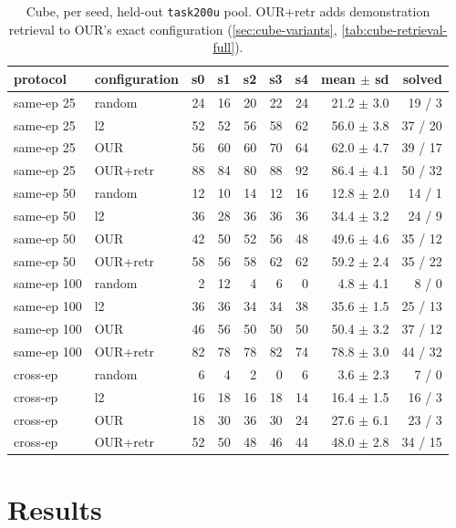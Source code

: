 \documentclass[11pt]{article}
\begin{document}
\begin{table}[H]
\centering\small
\caption{Cube, per seed, held-out \texttt{task200u} pool. OUR+retr adds demonstration
retrieval to OUR's exact configuration (\cref{sec:cube-variants}, \cref{tab:cube-retrieval-full}).}
\begin{tabular}{llrrrrrrr}
\toprule
protocol & configuration & s0 & s1 & s2 & s3 & s4 & mean $\pm$ sd & solved \\
\midrule
same-ep 25 & random & 24 & 16 & 20 & 22 & 24 & 21.2 $\pm$ 3.0 & 19 / 3 \\
same-ep 25 & l2 & 52 & 52 & 56 & 58 & 62 & 56.0 $\pm$ 3.8 & 37 / 20 \\
same-ep 25 & OUR & 56 & 60 & 60 & 70 & 64 & 62.0 $\pm$ 4.7 & 39 / 17 \\
same-ep 25 & OUR+retr & 88 & 84 & 80 & 88 & 92 & 86.4 $\pm$ 4.1 & 50 / 32 \\
\midrule
same-ep 50 & random & 12 & 10 & 14 & 12 & 16 & 12.8 $\pm$ 2.0 & 14 / 1 \\
same-ep 50 & l2 & 36 & 28 & 36 & 36 & 36 & 34.4 $\pm$ 3.2 & 24 / 9 \\
same-ep 50 & OUR & 42 & 50 & 52 & 56 & 48 & 49.6 $\pm$ 4.6 & 35 / 12 \\
same-ep 50 & OUR+retr & 58 & 56 & 58 & 62 & 62 & 59.2 $\pm$ 2.4 & 35 / 22 \\
\midrule
same-ep 100 & random & 2 & 12 & 4 & 6 & 0 & 4.8 $\pm$ 4.1 & 8 / 0 \\
same-ep 100 & l2 & 36 & 36 & 34 & 34 & 38 & 35.6 $\pm$ 1.5 & 25 / 13 \\
same-ep 100 & OUR & 46 & 56 & 50 & 50 & 50 & 50.4 $\pm$ 3.2 & 37 / 12 \\
same-ep 100 & OUR+retr & 82 & 78 & 78 & 82 & 74 & 78.8 $\pm$ 3.0 & 44 / 32 \\
\midrule
cross-ep & random & 6 & 4 & 2 & 0 & 6 & 3.6 $\pm$ 2.3 & 7 / 0 \\
cross-ep & l2 & 16 & 18 & 16 & 18 & 14 & 16.4 $\pm$ 1.5 & 16 / 3 \\
cross-ep & OUR & 18 & 30 & 36 & 30 & 24 & 27.6 $\pm$ 6.1 & 23 / 3 \\
cross-ep & OUR+retr & 52 & 50 & 48 & 46 & 44 & 48.0 $\pm$ 2.8 & 34 / 15 \\
\bottomrule
\end{tabular}
\end{table}

\section{Results}

\end{document}
